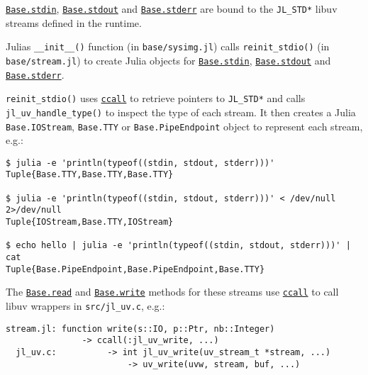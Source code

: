 \hyperlink{3330957653919693521}{\texttt{Base.stdin}}, \hyperlink{18181294266083891471}{\texttt{Base.stdout}} and \hyperlink{6150355911915549172}{\texttt{Base.stderr}} are bound to the \texttt{JL\_STD*} libuv streams defined in the runtime.



Julia{\textquotesingle}s \texttt{\_\_init\_\_()} function (in \texttt{base/sysimg.jl}) calls \texttt{reinit\_stdio()} (in \texttt{base/stream.jl}) to create Julia objects for \hyperlink{3330957653919693521}{\texttt{Base.stdin}}, \hyperlink{18181294266083891471}{\texttt{Base.stdout}} and \hyperlink{6150355911915549172}{\texttt{Base.stderr}}.



\texttt{reinit\_stdio()} uses \hyperlink{14245046751182637566}{\texttt{ccall}} to retrieve pointers to \texttt{JL\_STD*} and calls \texttt{jl\_uv\_handle\_type()} to inspect the type of each stream.  It then creates a Julia \texttt{Base.IOStream}, \texttt{Base.TTY} or \texttt{Base.PipeEndpoint} object to represent each stream, e.g.:




\begin{lstlisting}
$ julia -e 'println(typeof((stdin, stdout, stderr)))'
Tuple{Base.TTY,Base.TTY,Base.TTY}

$ julia -e 'println(typeof((stdin, stdout, stderr)))' < /dev/null 2>/dev/null
Tuple{IOStream,Base.TTY,IOStream}

$ echo hello | julia -e 'println(typeof((stdin, stdout, stderr)))' | cat
Tuple{Base.PipeEndpoint,Base.PipeEndpoint,Base.TTY}
\end{lstlisting}



The \hyperlink{8104134490906192097}{\texttt{Base.read}} and \hyperlink{16947913578760238729}{\texttt{Base.write}} methods for these streams use \hyperlink{14245046751182637566}{\texttt{ccall}} to call libuv wrappers in \texttt{src/jl\_uv.c}, e.g.:




\begin{lstlisting}
stream.jl: function write(s::IO, p::Ptr, nb::Integer)
               -> ccall(:jl_uv_write, ...)
  jl_uv.c:          -> int jl_uv_write(uv_stream_t *stream, ...)
                        -> uv_write(uvw, stream, buf, ...)
\end{lstlisting}



\hypertarget{10878739879441287330}{}


